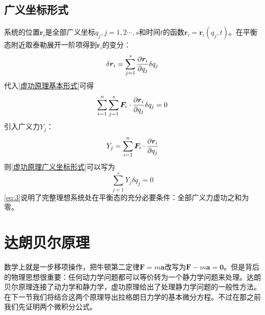         \subsection{广义坐标形式}
        系统的位置$\bm{r}_i$是全部广义坐标$q_j,j=1,2\cdots,s$和时间$t$的函数$\bm{r}_i=\bm{r}_i(q_j,t)$。在平衡态附近取泰勒展开一阶项得到$\bm{r}_i$的变分：
        \begin{equation}
            \label{eq:1}
            \delta\bm{r}_i=\sum_{j=1}^{s}\pdv{\bm{r}_i}{q_j}\delta q_j
        \end{equation}
        代入\ref{虚功原理基本形式}可得
        \begin{equation}
            \label{虚功原理广义坐标形式}
            \sum_{i=1}^{n}\sum_{j=1}^{s}\bm{F}_i\cdot\pdv{\bm{r}_i}{q_j}\delta q_j = 0
        \end{equation}
        引入广义力$Y_j$：
        \begin{equation}
            \label{eq:2}
            Y_j = \sum_{i=1}^{n}\bm{F}_i\cdot\pdv{\bm{r}_i}{q_j}
        \end{equation}
        则\ref{虚功原理广义坐标形式}可以写为
        \begin{equation}
            \label{eq:3}
            \sum_{j=1}^{s}Y_j\delta q_j = 0
        \end{equation}
        \ref{eq:3}说明了完整理想系统处在平衡态的充分必要条件：全部广义力虚功之和为零。
    
        
        \section{达朗贝尔原理}
        数学上就是一步移项操作，把牛顿第二定律$\bm{F}=m\bm{a}$改写为$\bm{F}-m\bm{a}=\bm{0}$。但是背后的物理思想很重要：任何动力学问题都可以等价转为一个静力学问题来处理。达朗贝尔原理连接了动力学和静力学，虚功原理给出了处理静力学问题的一般性方法。在下一节我们将结合这两个原理导出拉格朗日力学的基本微分方程。不过在那之前我们先证明两个微积分公式。
        
